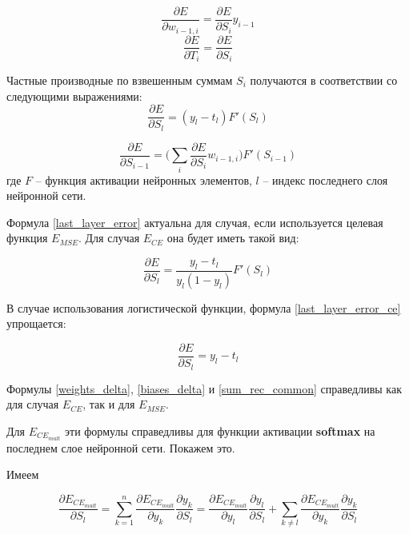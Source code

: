 \begin{equation}
	\label{weights_delta}
	\frac{\partial E}{\partial w_{i-1, i}} = \frac{\partial E}{\partial S_i} y_{i-1}
\end{equation}
\begin{equation}
	\label{biases_delta}
	\frac{\partial E}{\partial T_i} = \frac{\partial E}{\partial S_i}
\end{equation}

Частные производные по взвешенным суммам $S_i$ получаются в соответствии со следующими выражениями:
\begin{equation}
	\label{last_layer_error}
	\frac{\partial E}{\partial S_l} = (y_l - t_l)F'(S_l)
\end{equation}

\begin{equation}
	\label{sum_rec_common}
	\frac{\partial E}{\partial S_{i-1}} = \Bigg(\sum_{i}\frac{\partial E}{\partial S_i}w_{i-1, i}\Bigg)F'(S_{i-1})
\end{equation}
где $F$ -- функция активации нейронных элементов, $l$ -- индекс последнего слоя нейронной сети.

Формула \ref{last_layer_error} актуальна для случая, если используется целевая функция $E_{MSE}$. Для случая $E_{CE}$ она будет иметь такой вид:

\begin{equation}
	\label{last_layer_error_ce}
	\frac{\partial E}{\partial S_l} = \frac{y_l - t_l}{y_l(1-y_l)}F'(S_l)
\end{equation}

В случае использования логистической функции, формула \ref{last_layer_error_ce} упрощается:

\begin{equation}
	\frac{\partial E}{\partial S_l} = y_l - t_l
\end{equation}

Формулы \ref{weights_delta}, \ref{biases_delta} и \ref{sum_rec_common} справедливы как для случая $E_{CE}$, так и для $E_{MSE}$.

Для $E_{CE_{mult}}$ эти формулы справедливы для функции активации \textbf{softmax} на последнем слое нейронной сети. Покажем это.

Имеем

\begin{equation}
	\label{common_E}
	\frac{\partial E_{CE_{mult}}}{\partial S_l} = \sum_{k=1}^{n} \frac{\partial E_{CE_{mult}}}{\partial y_k}\frac{\partial y_k}{\partial S_l} = \frac{\partial E_{CE_{mult}}}{\partial y_l}\frac{\partial y_l}{\partial S_l} + \sum_{k\neq l}\frac{\partial E_{CE_{mult}}}{\partial y_k}\frac{\partial y_k}{\partial S_l}
\end{equation}

